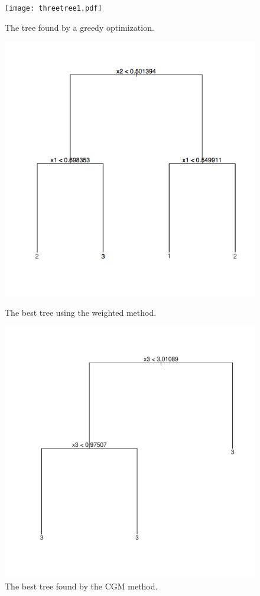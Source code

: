 \begin{figure}[h]
\centering
\label{fig:3fig_tree}
  \texttt{[image: threetree1.pdf]}
  \caption{The tree found by a greedy optimization.}\label{fig:awesome_image1}
  \end{figure}
  \begin{figure}[h]
  \centering
  \includegraphics[scale=0.4]{figures/simul_example_map_tree_USE.png}
  \caption{The best tree using the weighted method.}\label{fig:awesome_image4}
\endminipage\hfill
{}%
\hspace{-1cm}
 \includegraphics[scale=0.4]{figures/cgm_tree_simul.pdf}
  \caption{The best tree found by the CGM method.}\label{fig:awesome_image3}
\endminipage
\end{figure}
